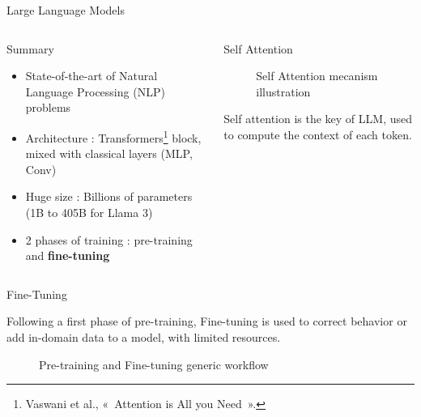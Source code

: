 \begin{frame}{Large Language Models}
\begin{columns}
      
    \begin{column}[t]{0.4\textwidth}
    \begin{block}{Summary}
    
        \begin{itemize}
            \item State-of-the-art of Natural Language Processing (NLP) problems
            \item Architecture : Transformers\footnote{Vaswani et al., « Attention is All you Need ».} block, mixed with classical layers (MLP, Conv)
            \item Huge size : Billions of parameters (1B to 405B for Llama 3)
            \item 2 phases of training : pre-training and \textbf{fine-tuning}
        \end{itemize}
            

    \end{block}
    \end{column}
        
    \begin{column}[t]{0.55\textwidth}
    \begin{block}{Self Attention }

        \begin{figure}
            \centering
            
            \caption{Self Attention mecanism illustration}
        \end{figure}
    
        Self attention is the key of LLM, used to compute the context of each token.
    \end{block}  
    \end{column}
         
\end{columns}
\end{frame}


\begin{frame}{Fine-Tuning}

    Following a first phase of pre-training, Fine-tuning is used to correct behavior or add in-domain data to a model, with limited resources. 


    \begin{figure}
        \centering
        \resizebox{\textwidth}{!}{
            
        }
        \caption{Pre-training and Fine-tuning generic workflow}
    \end{figure}  
        

    
\end{frame}

